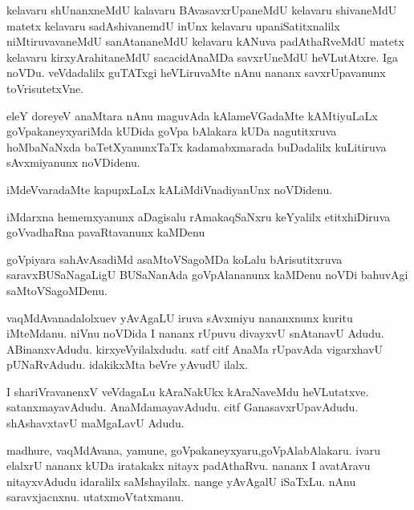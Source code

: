 \documentclass{article}
\begin{document}
\begin{mn}%
kelavaru shUnanxneMdU kalavaru BAvasavxrUpaneMdU kelavaru shivaneMdU matetx kelavaru 
sadAshivanemdU inUnx kelavaru upaniSatitxnalilx niMtiruvavaneMdU sanAtananeMdU kelavaru 
kANuva padAthaRveMdU matetx kelavaru kirxyArahitaneMdU sacacidAnaMDa savxrUneMdU 
heVLutAtxre. Iga noVDu. veVdadalilx guTATxgi heVLiruvaMte nAnu nananx savxrUpavanunx 
toVrisutetxVne.
\end{mn}

\begin{mn}%
eleY doreyeV anaMtara nAnu maguvAda kAlameVGadaMte kAMtiyuLaLx goVpakaneyxyariMda kUDida 
goVpa bAlakara kUDa nagutitxruva hoMbaNaNxda baTetXyanunxTaTx kadamabxmarada buDadalilx 
kuLitiruva sAvxmiyanunx noVDidenu.
\end{mn}

\begin{mn}%
iMdeVvaradaMte kapupxLaLx kALiMdiVnadiyanUnx noVDidenu.
\end{mn}

\begin{mn}%
iMdarxna hememxyanunx aDagisalu rAmakaqSaNxru keYyalilx etitxhiDiruva goVvadhaRna 
pavaRtavanunx kaMDenu
\end{mn}

\begin{mn}%
goVpiyara sahAvAsadiMd asaMtoVSagoMDa koLalu bArisutitxruva saravxBUSaNagaLigU BUSaNanAda 
goVpAlananunx kaMDenu noVDi bahuvAgi saMtoVSagoMDenu.
\end{mn}

\begin{mn}%
vaqMdAvanadalolxuev yAvAgaLU  iruva sAvxmiyu nananxnunx kuritu iMteMdanu. niVnu noVDida I 
nananx rUpuvu divayxvU snAtanavU Adudu. ABinanxvAdudu. kirxyeVyilalxdudu. satf citf AnaMa 
rUpavAda vigarxhavU pUNaRvAdudu. idakikxMta beVre yAvudU ilalx.
\end{mn}

\begin{mn}%
I shariVravanenxV veVdagaLu kAraNakUkx kAraNaveMdu heVLutatxve. satanxmayavAdudu. 
AnaMdamayavAdudu. citf GanasavxrUpavAdudu. shAshavxtavU maMgaLavU Adudu.
\end{mn}

\begin{mn}%
madhure, vaqMdAvana, yamune, goVpakaneyxyaru,goVpAlabAlakaru. ivaru  elalxrU nananx kUDa 
iratakakx nitayx padAthaRvu. nananx I avatAravu nitayxvAdudu idaralilx saMshayilalx. nange 
yAvAgalU iSaTxLu. nAnu saravxjacnxnu. utatxmoVtatxmanu.
\end{mn}
\end{document}
